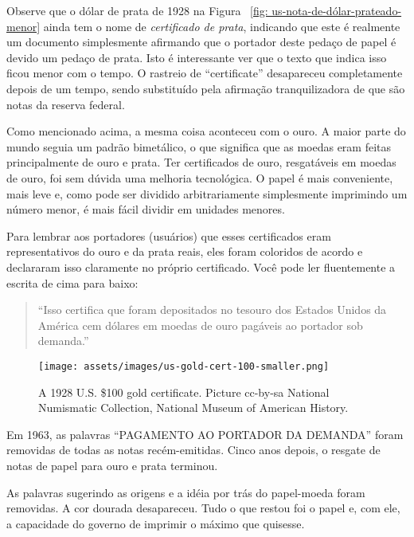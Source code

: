 Observe que o dólar de prata de 1928 na Figura ~\ref{fig: us-nota-de-dólar-prateado-menor} 
ainda tem o nome de \textit{certificado de prata}, indicando que este é realmente um documento 
simplesmente afirmando que o portador deste pedaço de papel é devido um pedaço de prata. Isto é
interessante ver que o texto que indica isso ficou menor com o tempo. O rastreio de \enquote{certificate} 
desapareceu completamente depois de um tempo, sendo substituído pela afirmação tranquilizadora 
de que são notas da reserva federal.

Como mencionado acima, a mesma coisa aconteceu com o ouro. A maior parte do mundo seguia um padrão 
bimetálico, o que significa que as moedas eram feitas principalmente de ouro e prata. Ter certificados 
de ouro, resgatáveis em moedas de ouro, foi sem dúvida uma melhoria tecnológica. O papel é mais 
conveniente, mais leve e, como pode ser dividido arbitrariamente simplesmente imprimindo um número 
menor, é mais fácil dividir em unidades menores.

Para lembrar aos portadores (usuários) que esses certificados eram representativos do ouro 
e da prata reais, eles foram coloridos de acordo e declararam isso claramente no próprio 
certificado. Você pode ler fluentemente a escrita de cima para baixo:

\begin{quotation}\begin{samepage}
\enquote{Isso certifica que foram depositados no tesouro dos Estados Unidos da América cem dólares em moedas 
de ouro pagáveis ao portador sob demanda.}
\end{samepage}\end{quotation}

\begin{figure}
  \centering
  \texttt{[image: assets/images/us-gold-cert-100-smaller.png]}
  \caption{A 1928 U.S. \$100 gold certificate. Picture cc-by-sa National Numismatic Collection, National Museum of American History.}
  \label{fig:us-gold-cert-100-smaller}
\end{figure}

Em 1963, as palavras \enquote{PAGAMENTO AO PORTADOR DA DEMANDA} foram removidas de todas as notas 
recém-emitidas. Cinco anos depois, o resgate de notas de papel para ouro e prata terminou.

As palavras sugerindo as origens e a idéia por trás do papel-moeda foram removidas. A cor dourada 
desapareceu. Tudo o que restou foi o papel e, com ele, a capacidade do governo de imprimir o máximo 
que quisesse.

